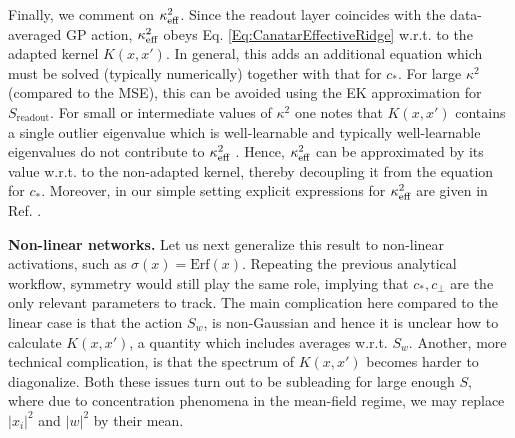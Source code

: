 Finally, we comment on $\kappa^2_{\text{eff}}$. Since the readout layer coincides with the data-averaged GP action, $\kappa^2_{\text{eff}}$ obeys Eq. \ref{Eq:CanatarEffectiveRidge} w.r.t. to the adapted kernel $K(x,x')$. In general, this adds an additional equation which must be solved (typically numerically) together with that for $c_*$. For large $\kappa^2$ (compared to the MSE), this can be avoided using the EK approximation for $S_{\text{readout}}$. For small or intermediate values of $\kappa^2$ one notes that $K(x,x')$ contains a single outlier eigenvalue which is well-learnable and typically well-learnable eigenvalues do not contribute to $\kappa^2_{\text{eff}}$ . Hence, $\kappa^2_{\text{eff}}$ can be approximated by its value w.r.t. to the non-adapted kernel, thereby decoupling it from the equation for $c_*$. Moreover, in our simple setting explicit expressions for $\kappa^2_{\text{eff}}$ are given in Ref. \cite{Canatar2021}.   

{\bf Non-linear networks.} Let us next generalize this result to non-linear activations, such as $\sigma(x)=\text{Erf}(x)$. Repeating the previous analytical workflow, symmetry would still play the same role, implying that $c_*,c_{\perp}$ are the only relevant parameters to track. The main complication here compared to the linear case is that the action $S_w$, is non-Gaussian and hence it is unclear how to calculate $K(x,x')$, a quantity which includes averages w.r.t. $S_w$. Another, more technical complication, is that the spectrum of $K(x,x')$ becomes harder to diagonalize. Both these issues turn out to be subleading for large enough $S$, where due to concentration phenomena in the mean-field regime, we may replace $|{x}_i|^2$ and $|{w}|^2$ by their mean. 

